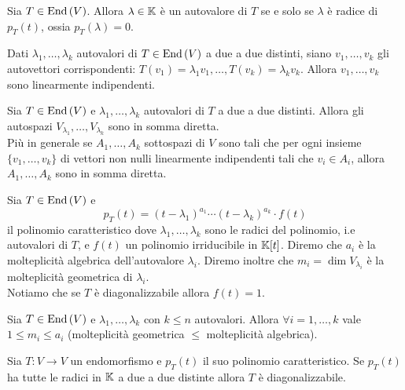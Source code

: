 \begin{thm}
	Sia $ T \in \operatorname{End}{(V)} $. Allora $ \lambda \in \mathbb{K} $ è un autovalore di $ T $ se e solo se $ \lambda $ è radice di $ p_T(t) $, ossia $ p_T(\lambda) = 0 $. 
\end{thm}

\begin{thm}
	Dati $ \lambda_1, \ldots, \lambda_k $ autovalori di $ T \in \operatorname{End}{(V)} $ a due a due distinti, siano $ v_1, \ldots, v_k $ gli autovettori corrispondenti: $ T(v_1) = \lambda_1 v_1, \ldots, T(v_k) = \lambda_k v_k $. Allora $ v_1, \ldots, v_k $ sono linearmente indipendenti. 
\end{thm}

\begin{thm}
	Sia $ T \in \operatorname{End}{(V)} $ e $ \lambda_1, \ldots, \lambda_k $ autovalori di $ T $ a due a due distinti. Allora gli autospazi $ V_{\lambda_1}, \ldots, V_{\lambda_k} $ sono in somma diretta. \\
	Più in generale se $ A_1, \ldots, A_k $ sottospazi di $ V $ sono tali che per ogni insieme $ \{v_1, \ldots, v_k\} $ di vettori non nulli linearmente indipendenti tali che $ v_i \in A_i $, allora $ A_1, \ldots, A_k $ sono in somma diretta. 
\end{thm}

\begin{definition}
	Sia $ T \in \operatorname{End}{(V)} $ e \[p_T(t) = (t - \lambda_1)^{a_1} \cdots (t - \lambda_k)^{a_k} \cdot f(t)\] il polinomio caratteristico dove $ \lambda_1, \ldots, \lambda_k $ sono le radici del polinomio, i.e autovalori di $ T $, e $ f(t) $ un polinomio irriducibile in $ \mathbb{K}[t] $. Diremo che $ a_i $ è la molteplicità algebrica dell'autovalore $ \lambda_i $. Diremo inoltre che $ m_i = \dim{V_{\lambda_i}} $ è la molteplicità geometrica di $ \lambda_i $. \\
	Notiamo che se $ T $ è diagonalizzabile allora $ f(t) = 1 $. 
\end{definition}

\begin{thm}
	Sia $ T \in \operatorname{End}{(V)} $ e $ \lambda_1, \ldots, \lambda_k $ con $ k \leq n $ autovalori. Allora $ \forall i = 1, \ldots, k $ vale $ 1 \leq m_i \leq a_i $ (molteplicità geometrica $ \leq $ molteplicità algebrica). 
\end{thm}

\begin{corollary}
	Sia $ T \colon V \to V $ un endomorfismo e $ p_T(t) $ il suo polinomio caratteristico. Se $ p_T(t) $ ha tutte le radici in $ \mathbb{K} $ a due a due distinte allora $ T $ è diagonalizzabile. 
\end{corollary}

